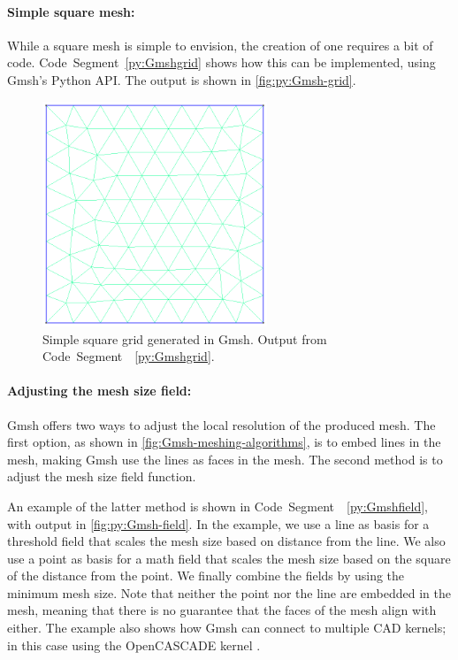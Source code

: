 \paragraph{Simple square mesh:}
While a square mesh is simple to envision, the creation of one requires a bit of code. Code~Segment~\ref{py:Gmshgrid} shows how this can be implemented, using Gmsh's Python API. The output is shown in \autoref{fig:py:Gmsh-grid}.


\begin{figure}[tp]
    \centering
    \includegraphics[width=0.6\textwidth]{report/Images/Software/Gmsh examples/gmsh_square_mesh.png}
    \caption[Simple square grid generated in Gmsh]{Simple square grid generated in Gmsh. Output from Code~Segment~~\ref{py:Gmshgrid}.}
    \label{fig:py:Gmsh-grid}
\end{figure}


\paragraph{Adjusting the mesh size field:}
Gmsh offers two ways to adjust the local resolution of the produced mesh. The first option, as shown in \autoref{fig:Gmsh-meshing-algorithms}, is to embed lines in the mesh, making Gmsh use the lines as faces in the mesh. The second method is to adjust the mesh size field function.

An example of the latter method is shown in Code~Segment~~\ref{py:Gmshfield}, with output in \autoref{fig:py:Gmsh-field}. In the example, we use a line as basis for a threshold field that scales the mesh size based on distance from the line. We also use a point as basis for a math field that scales the mesh size based on the square of the distance from the point. We finally combine the fields by using the minimum mesh size. Note that neither the point nor the line are embedded in the mesh, meaning that there is no guarantee that the faces of the mesh align with either. The example also shows how Gmsh can connect to multiple CAD kernels; in this case using the OpenCASCADE kernel \cite{Gmsh_reference}.

